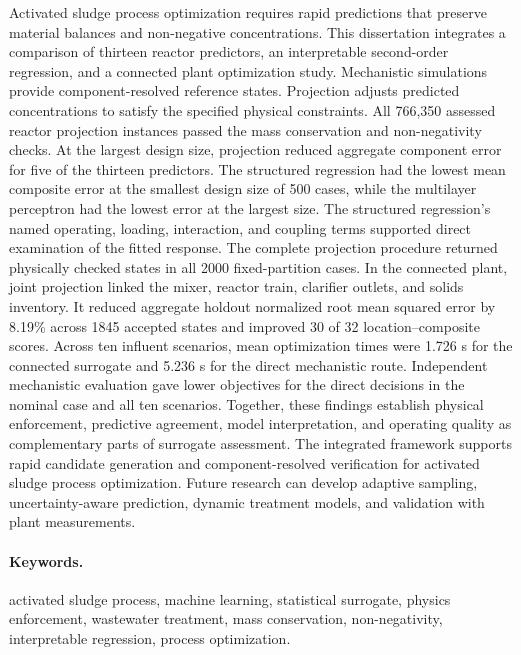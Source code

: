 \documentclass[12pt,twoside]{book}
\begin{document}
Activated sludge process optimization requires rapid predictions that preserve material balances and non-negative concentrations. This dissertation integrates a comparison of thirteen reactor predictors, an interpretable second-order regression, and a connected plant optimization study. Mechanistic simulations provide component-resolved reference states. Projection adjusts predicted concentrations to satisfy the specified physical constraints. All 766,350 assessed reactor projection instances passed the mass conservation and non-negativity checks. At the largest design size, projection reduced aggregate component error for five of the thirteen predictors. The structured regression had the lowest mean composite error at the smallest design size of 500 cases, while the multilayer perceptron had the lowest error at the largest size. The structured regression's named operating, loading, interaction, and coupling terms supported direct examination of the fitted response. The complete projection procedure returned physically checked states in all 2000 fixed-partition cases. In the connected plant, joint projection linked the mixer, reactor train, clarifier outlets, and solids inventory. It reduced aggregate holdout normalized root mean squared error by 8.19\% across 1845 accepted states and improved 30 of 32 location--composite scores. Across ten influent scenarios, mean optimization times were 1.726 s for the connected surrogate and 5.236 s for the direct mechanistic route. Independent mechanistic evaluation gave lower objectives for the direct decisions in the nominal case and all ten scenarios. Together, these findings establish physical enforcement, predictive agreement, model interpretation, and operating quality as complementary parts of surrogate assessment. The integrated framework supports rapid candidate generation and component-resolved verification for activated sludge process optimization. Future research can develop adaptive sampling, uncertainty-aware prediction, dynamic treatment models, and validation with plant measurements.

\paragraph*{Keywords.} activated sludge process, machine learning, statistical surrogate, physics enforcement, wastewater treatment, mass conservation, non-negativity, interpretable regression, process optimization.

\cleardoublepage
\tableofcontents
\cleardoublepage
\listoffigures
\cleardoublepage
\listoftables
\end{document}
